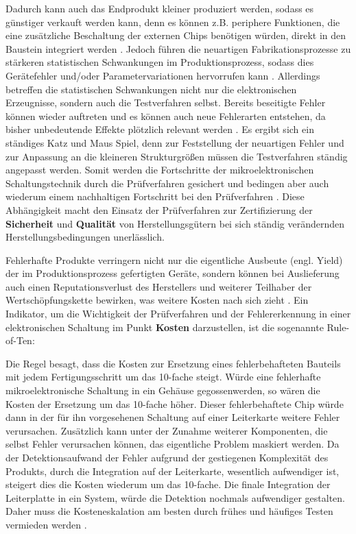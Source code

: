     Dadurch kann auch das Endprodukt kleiner produziert werden, sodass es günstiger verkauft werden kann, denn es können z.B. periphere Funktionen, die eine zusätzliche Beschaltung der externen Chips benötigen würden, direkt in den Baustein integriert werden \cite{berger_test-_2012}.
    Jedoch führen die neuartigen Fabrikationsprozesse zu stärkeren statistischen Schwankungen im Produktionsprozess, sodass dies Gerätefehler und/oder Parametervariationen hervorrufen kann \cite{berger_test-_2012} \cite{grout_integrated_2006}.
    Allerdings betreffen die statistischen Schwankungen nicht nur die elektronischen Erzeugnisse, sondern auch die Testverfahren selbst.
    Bereits beseitigte Fehler können wieder auftreten und es können auch neue Fehlerarten entstehen, da bisher unbedeutende Effekte plötzlich relevant werden \cite{berger_test-_2012}.
    Es ergibt sich ein ständiges Katz und Maus Spiel, denn zur Feststellung der neuartigen Fehler und zur Anpassung an die kleineren Strukturgrößen müssen die Testverfahren ständig angepasst werden.
    Somit werden die Fortschritte der mikroelektronischen Schaltungstechnik durch die Prüfverfahren gesichert und bedingen aber auch wiederum einem nachhaltigen Fortschritt bei den Prüfverfahren \cite{eggersglus_test_2014}.
    Diese Abhängigkeit macht den Einsatz der Prüfverfahren zur Zertifizierung der \textbf{Sicherheit} und \textbf{Qualität} von Herstellungsgütern bei sich ständig verändernden Herstellungsbedingungen unerlässlich.

    Fehlerhafte Produkte verringern nicht nur die eigentliche Ausbeute (engl. Yield) der im Produktionsprozess gefertigten Geräte, sondern können bei Auslieferung auch einen Reputationsverlust des Herstellers und weiterer Teilhaber der Wertschöpfungskette bewirken, was weitere Kosten nach sich zieht \cite{eggersglus_test_2014}.
    Ein Indikator, um die Wichtigkeit der Prüfverfahren und der Fehlererkennung in einer elektronischen Schaltung im Punkt \textbf{Kosten} darzustellen, ist die sogenannte \glqq Rule-of-Ten\grqq\@: \cite{grout_integrated_2006} \cite{eggersglus_test_2014}

    Die Regel besagt, dass die Kosten zur Ersetzung eines fehlerbehafteten Bauteils mit jedem Fertigungsschritt um das 10-fache steigt.
    Würde eine fehlerhafte mikroelektronische Schaltung in ein Gehäuse \glqq gegossen\grqq\@ werden, so wären die Kosten der Ersetzung um das 10-fache höher.
    Dieser fehlerbehaftete Chip würde dann in der für ihn vorgesehenen Schaltung auf einer Leiterkarte weitere Fehler verursachen.
    Zusätzlich kann unter der Zunahme weiterer Komponenten, die selbst Fehler verursachen können, das eigentliche Problem maskiert werden.
    Da der Detektionsaufwand der Fehler aufgrund der gestiegenen Komplexität des Produkts, durch die Integration auf der Leiterkarte, wesentlich aufwendiger ist, steigert dies die Kosten wiederum um das 10-fache.
    Die finale Integration der Leiterplatte in ein System, würde die Detektion nochmals aufwendiger gestalten. \cite{eggersglus_test_2014}
    Daher muss die Kosteneskalation am besten durch frühes und häufiges Testen vermieden werden \cite{grout_integrated_2006}.

